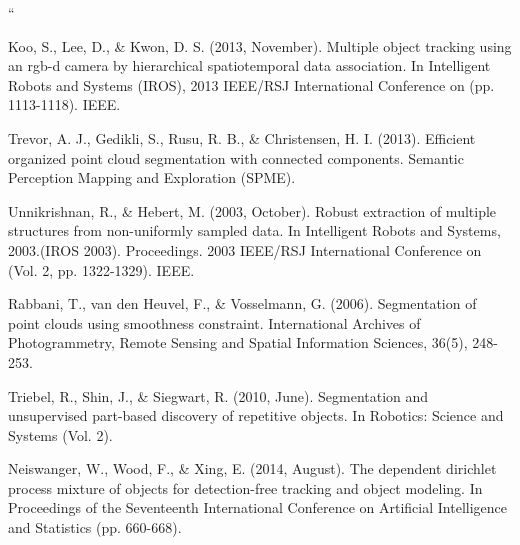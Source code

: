 \documentclass[twoside,hidelinks]{article}
\begin{document}
\begin{thebibliography}{9}




``

\newblock Koo, S., Lee, D., \& Kwon, D. S. (2013, November). Multiple object tracking using an rgb-d camera by hierarchical spatiotemporal data association. In Intelligent Robots and Systems (IROS), 2013 IEEE/RSJ International Conference on (pp. 1113-1118). IEEE.

\newblock Trevor, A. J., Gedikli, S., Rusu, R. B., \& Christensen, H. I. (2013). Efficient organized point cloud segmentation with connected components. Semantic Perception Mapping and Exploration (SPME).

\newblock Unnikrishnan, R., \& Hebert, M. (2003, October). Robust extraction of multiple structures from non-uniformly sampled data. In Intelligent Robots and Systems, 2003.(IROS 2003). Proceedings. 2003 IEEE/RSJ International Conference on (Vol. 2, pp. 1322-1329). IEEE. 

\newblock Rabbani, T., van den Heuvel, F., \& Vosselmann, G. (2006). Segmentation of point clouds using smoothness constraint. International Archives of Photogrammetry, Remote Sensing and Spatial Information Sciences, 36(5), 248-253.

\newblock Triebel, R., Shin, J., \& Siegwart, R. (2010, June). Segmentation and unsupervised part-based discovery of repetitive objects. In Robotics: Science and Systems (Vol. 2).

\newblock Neiswanger, W., Wood, F., \& Xing, E. (2014, August). The dependent dirichlet process mixture of objects for detection-free tracking and object modeling. In Proceedings of the Seventeenth International Conference on Artificial Intelligence and Statistics (pp. 660-668).


\end{thebibliography}
\end{document}
